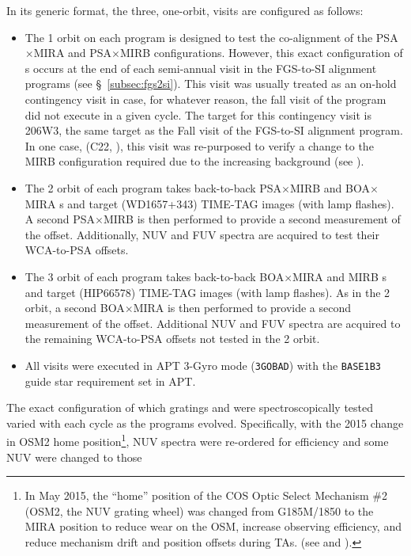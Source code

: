 In its generic format, the three, one-orbit, visits are configured as follows:
\begin{itemize}
	\item{The 1 orbit on each program is designed to test the co-alignment of the PSA$\times$MIRA and PSA$\times$MIRB  configurations.
However, this exact configuration of s occurs at the end of each semi-annual visit in the FGS-to-SI alignment programs (see \S~\ref{subsec:fgs2si}).
This visit was usually treated as an on-hold contingency visit in case, for whatever reason, the fall visit of the program did not execute in a given cycle.
The target for this contingency visit is 206W3, the same target as the Fall visit of the FGS-to-SI alignment program.
In one case, (C22, ), this visit was re-purposed to verify a change to the MIRB configuration required due to the increasing background (see ).}
	\item{The 2 orbit of each program takes back-to-back PSA$\times$MIRB and BOA$\times$MIRA s and target (WD1657+343) TIME-TAG images (with lamp flashes).
	A second PSA$\times$MIRB  is then performed to provide a second measurement of the offset.
	Additionally, NUV and FUV spectra are acquired to test their WCA-to-PSA offsets.}
	\item{The 3 orbit of each program takes back-to-back BOA$\times$MIRA and MIRB s and target (HIP66578) TIME-TAG images (with lamp flashes).
	As in the 2 orbit, a second BOA$\times$MIRA  is then performed to provide a second measurement of the offset.
	Additional NUV and FUV spectra are acquired to the remaining WCA-to-PSA offsets not tested in the 2 orbit.}
	\item{All visits were executed in APT 3-Gyro mode (\texttt{3GOBAD}) with the \texttt{BASE1B3} guide star requirement set in APT.}
\end{itemize}
The exact configuration of which gratings and \cenwaves{} were spectroscopically tested varied with each cycle as the programs evolved.
Specifically, with the 2015 change in OSM2 home position\footnote{In May 2015, the ``home'' position of the COS Optic Select Mechanism \#2 (OSM2, the NUV grating wheel) was changed from G185M/1850 to the MIRA position to reduce wear on the OSM, increase observing efficiency, and reduce mechanism drift and position offsets during  TAs. (see  and ).}, NUV spectra were re-ordered for efficiency and some NUV \cenwaves{} were changed to those

